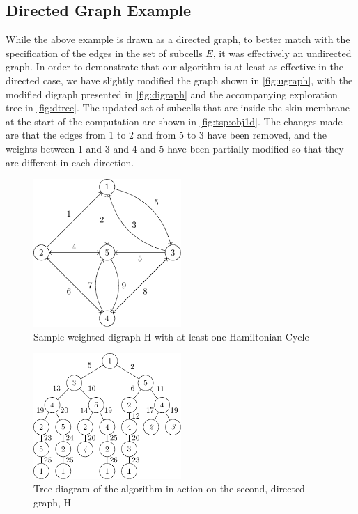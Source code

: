 \subsection{Directed Graph Example}
While the above example is drawn as a directed graph, to better match with the specification of the edges in the set of subcells \(E\), it was effectively an undirected graph.  In order to demonstrate that our algorithm is at least as effective in the directed case, we have slightly modified the graph shown in \autoref{fig:ugraph}, with the modified digraph presented in \autoref{fig:digraph} and the accompanying exploration tree in \autoref{fig:dtree}.  The updated set of subcells that are inside the skin membrane at the start of the computation are shown in \autoref{fig:tsp:obj1d}.  The changes made are that the edges from 1 to 2 and from 5 to 3 have been removed, and the weights between 1 and 3 and 4 and 5 have been partially modified so that they are different in each direction.

\begin{figure}
\centering
\includegraphics[width=0.5\textwidth]{chapters/tsp/figs/ugraph-figure2}
\caption{\label{fig:digraph}Sample weighted digraph H with at least one Hamiltonian Cycle}
\end{figure}

\begin{figure}
\centering
\includegraphics[width=0.5\textwidth]{chapters/tsp/figs/ugraph-figure3}
\caption{\label{fig:dtree}Tree diagram of the algorithm in action on the second, directed graph, H}
\end{figure}

